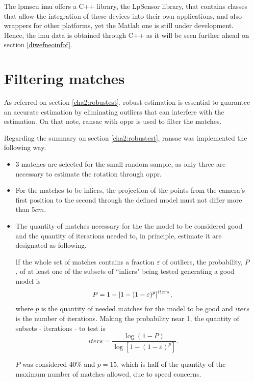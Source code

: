 The \acrshort{lpmscu} \acrshort{imu} offers a C++ library, the LpSensor library, that contains classes that allow the integration of these devices into their own applications, and also wrappers for other platforms, yet the Matlab one is still under development. Hence, the \acrshort{imu} data is obtained through C++ as it will be seen further ahead on section \ref{diwefneoinfof}.

\section{Filtering matches}
\label{rnfireonce}
As referred on section \ref{cha2:robustest}, robust estimation is essential to guarantee an accurate estimation by eliminating outliers that can interfere with the estimation. On that note, \acrshort{ransac} with \acrshort{oppr} is used to filter the matches.

Regarding the summary on section \ref{cha2:robustest}, \acrshort{ransac} was implemented the following way.

\begin{itemize}
	\item 3 matches are selected for the small random sample, as only three are necessary to estimate the rotation through \acrshort{oppr}.
	\item For the matches to be inliers, the projection of the points from the camera's first position to the second through the defined model must not differ more than $5 cm$.
	\item The quantity of matches necessary for the the model to be considered good and the quantity of iterations needed to, in principle, estimate it are designated as following.
	
	If the whole set of matches contains a fraction $\varepsilon$ of outliers, the probability, $P$, of at least one of the subsets of ``inliers" being tested generating a good model is 
	\begin{equation}
	P=1-\left[1-(1-\varepsilon)^{p}\right]^{iters},\\
	\end{equation}
	where $p$ is the quantity of needed matches for the model to be good and $iters$ is the number of iterations. \cite{detep}
	Making the probability near 1, the quantity of subsets - iterations - to test is
	\begin{equation}
	iters = \frac{\log (1-P)}{\log \left[1-(1-\varepsilon)^{p}\right]}.
	\end{equation}
	
	$P$ was considered $40\%$ and $p = 15$, which is half of the quantity of the maximum number of matches allowed, due to speed concerns. 
\end{itemize}

